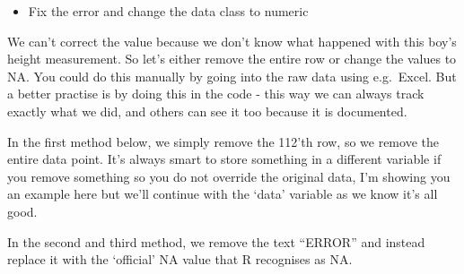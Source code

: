 \documentclass[
  letterpaper,
  DIV=11,
  numbers=noendperiod]{scrreprt}
\newenvironment{Shaded}{}{}
\newcommand{\CommentTok}[1]{\textcolor[rgb]{0.42,0.45,0.49}{#1}}
\newcommand{\DecValTok}[1]{\textcolor[rgb]{0.00,0.36,0.77}{#1}}
\newcommand{\DocumentationTok}[1]{\textcolor[rgb]{0.42,0.45,0.49}{#1}}
\newcommand{\FunctionTok}[1]{\textcolor[rgb]{0.44,0.26,0.76}{#1}}
\newcommand{\NormalTok}[1]{\textcolor[rgb]{0.14,0.16,0.18}{#1}}
\newcommand{\OtherTok}[1]{\textcolor[rgb]{0.44,0.26,0.76}{#1}}
\newcommand{\SpecialCharTok}[1]{\textcolor[rgb]{0.00,0.36,0.77}{#1}}
\providecommand{\tightlist}{%
  \setlength{\itemsep}{0pt}\setlength{\parskip}{0pt}}\usepackage{longtable,booktabs,array}
\begin{document}
\begin{itemize}
\tightlist
\item
  Fix the error and change the data class to numeric
\end{itemize}

\begin{tcolorbox}[enhanced jigsaw, arc=.35mm, left=2mm, titlerule=0mm, rightrule=.15mm, colframe=quarto-callout-tip-color-frame, coltitle=black, colback=white, opacityback=0, bottomtitle=1mm, bottomrule=.15mm, colbacktitle=quarto-callout-tip-color!10!white, breakable, title=\textcolor{quarto-callout-tip-color}{\faLightbulb}\hspace{0.5em}{Code and answer}, toptitle=1mm, toprule=.15mm, opacitybacktitle=0.6, leftrule=.75mm]

We can't correct the value because we don't know what happened with this
boy's height measurement. So let's either remove the entire row or
change the values to NA. You could do this manually by going into the
raw data using e.g.~Excel. But a better practise is by doing this in the
code - this way we can always track exactly what we did, and others can
see it too because it is documented.

In the first method below, we simply remove the 112'th row, so we remove
the entire data point. It's always smart to store something in a
different variable if you remove something so you do not override the
original data, I'm showing you an example here but we'll continue with
the `data' variable as we know it's all good.

In the second and third method, we remove the text ``ERROR'' and instead
replace it with the `official' NA value that R recognises as NA.

\begin{Shaded}
\end{Shaded}
\end{tcolorbox}
\end{document}
